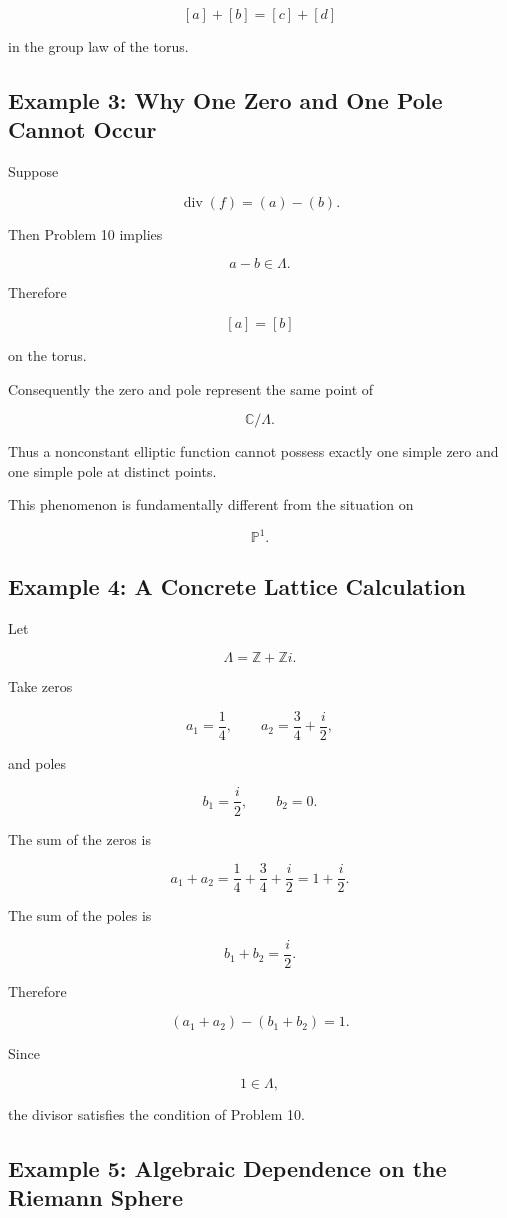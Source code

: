 \documentclass[12pt,a4paper]{article}
\theoremstyle{notespace}
\begin{document}
\[
[a]+[b]
=
[c]+[d]
\]

in the group law of the torus.

\subsection{Example 3: Why One Zero and One Pole Cannot Occur}

Suppose

\[
\operatorname{div}(f)
=
(a)-(b).
\]

Then Problem 10 implies

\[
a-b\in\Lambda.
\]

Therefore

\[
[a]=[b]
\]

on the torus.

Consequently the zero and pole represent the same point of

\[
\mathbb C/\Lambda.
\]

Thus a nonconstant elliptic function cannot possess exactly one simple zero and one simple pole at distinct points.

This phenomenon is fundamentally different from the situation on

\[
\mathbb P^1.
\]

\subsection{Example 4: A Concrete Lattice Calculation}

Let

\[
\Lambda=\mathbb Z+\mathbb Zi.
\]

Take zeros

\[
a_1=\frac14,
\qquad
a_2=\frac34+\frac{i}{2},
\]

and poles

\[
b_1=\frac{i}{2},
\qquad
b_2=0.
\]

The sum of the zeros is

\[
a_1+a_2
=
\frac14+\frac34+\frac{i}{2}
=
1+\frac{i}{2}.
\]

The sum of the poles is

\[
b_1+b_2
=
\frac{i}{2}.
\]

Therefore

\[
(a_1+a_2)-(b_1+b_2)
=
1.
\]

Since

\[
1\in\Lambda,
\]

the divisor satisfies the condition of Problem 10.

\subsection{Example 5: Algebraic Dependence on the Riemann Sphere}
\end{document}
